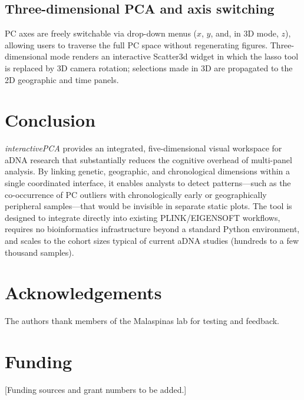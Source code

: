\documentclass[unnumsec,webpdf,contemporary,large]{oup-authoring-template}
\begin{document}
\subsection{Three-dimensional PCA and axis switching}

PC axes are freely switchable via drop-down menus ($x$, $y$, and, in
3D mode, $z$), allowing users to traverse the full PC space without
regenerating figures.
Three-dimensional mode renders an interactive Scatter3d widget in which
the lasso tool is replaced by 3D camera rotation; selections made in
3D are propagated to the 2D geographic and time panels.

\section{Conclusion}

\textit{interactivePCA} provides an integrated, five-dimensional visual
workspace for aDNA research that substantially reduces the cognitive
overhead of multi-panel analysis.
By linking genetic, geographic, and chronological dimensions within a
single coordinated interface, it enables analysts to detect
patterns---such as the co-occurrence of PC outliers with
chronologically early or geographically peripheral
samples---that would be invisible in separate static plots.
The tool is designed to integrate directly into existing
PLINK/EIGENSOFT workflows, requires no bioinformatics infrastructure
beyond a standard Python environment, and scales to the cohort sizes
typical of current aDNA studies (hundreds to a few thousand samples).

\section*{Acknowledgements}

The authors thank members of the Malaspinas lab for testing and
feedback.

\section*{Funding}

[Funding sources and grant numbers to be added.]
\end{document}
